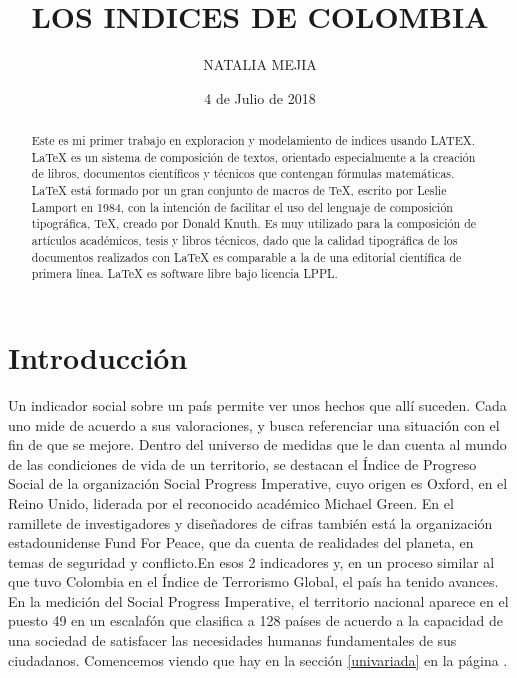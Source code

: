 \documentclass{article}
\title{LOS INDICES DE COLOMBIA}
\author[1]{\normalsize NATALIA MEJIA}
\affil[1]{\small  Escuela de Ingeniería,Universidad de los Andes\\
\texttt{{n.mejia12}@uniandes.edu.co}}
\date{4 de Julio de 2018}
\begin{document}


\maketitle


\begin{abstract}
Este es mi primer trabajo en exploracion y modelamiento de indices usando LATEX. LaTeX es un sistema de composición de textos, orientado especialmente a la creación de libros, documentos científicos y técnicos que contengan fórmulas matemáticas. LaTeX está formado por un gran conjunto de macros de TeX, escrito por Leslie Lamport en 1984, con la intención de facilitar el uso del lenguaje de composición tipográfica, TeX, creado por Donald Knuth. Es muy utilizado para la composición de artículos académicos, tesis y libros técnicos, dado que la calidad tipográfica de los documentos realizados con LaTeX es comparable a la de una editorial científica de primera línea. LaTeX es software libre bajo licencia LPPL. 
\end{abstract}



\section*{Introducción}

Un indicador social sobre un país permite ver unos hechos que allí suceden. Cada uno mide de acuerdo a sus valoraciones, y busca referenciar una situación con el fin de que se mejore. Dentro del universo de medidas que le dan cuenta al mundo de las condiciones de vida de un territorio, se destacan el Índice de Progreso Social de la organización Social Progress Imperative, cuyo origen es Oxford, en el Reino Unido, liderada por el reconocido académico Michael Green. En el ramillete de investigadores y diseñadores de cifras también está la organización estadounidense Fund For Peace, que da cuenta de realidades del planeta, en temas de seguridad y conflicto.En esos 2 indicadores y, en un proceso similar al que tuvo Colombia en el Índice de Terrorismo Global, el país ha tenido avances. En la medición del Social Progress Imperative, el territorio nacional aparece en el puesto 49 en un escalafón que clasifica a 128 países de acuerdo a la capacidad de una sociedad de satisfacer las necesidades humanas fundamentales de sus ciudadanos.
Comencemos viendo que hay en la sección \ref{univariada} en la página \pageref{univariada}.
\end{document}
